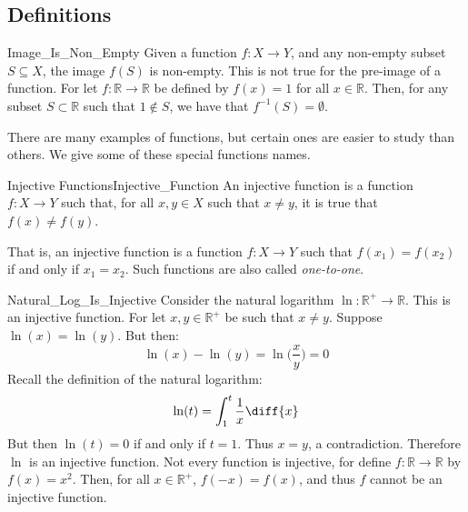     \subsection{Definitions}
        \begin{lexample}{}{Image_Is_Non_Empty}
            Given a function $f:X\rightarrow{Y}$, and any non-empty subset
            $S\subseteq{X}$, the image $f(S)$ is non-empty. This is not
            true for the pre-image of a function. For let
            $f:\mathbb{R}\rightarrow\mathbb{R}$ be defined by $f(x)=1$ for
            all $x\in\mathbb{R}$. Then, for any subset $S\subset\mathbb{R}$
            such that $1\notin{S}$, we have that
            $f^{\minus{1}}(S)=\emptyset$.
        \end{lexample}
        There are many examples of functions, but certain ones are easier
        to study than others. We give some of these special functions names.
        \begin{ldefinition}{Injective Functions}{Injective_Function}
            An \gls{injective function} is a function
            $f:X\rightarrow{Y}$ such that, for all
            $x,y\in{X}$ such that $x\ne{y}$, it is true that
            $f(x)\ne{f}(y)$.
        \end{ldefinition}
        That is, an injective function is a function
        $f:X\rightarrow{Y}$ such that $f(x_{1})=f(x_{2})$
        if and only if $x_{1}=x_{2}$. Such functions are also
        called \textit{one-to-one}.
        \begin{lexample}{}{Natural_Log_Is_Injective}
            Consider the natural logarithm
            $\ln:\mathbb{R}^{+}\rightarrow\mathbb{R}$. This is an injective
            function. For let $x,y\in\mathbb{R}^{+}$ be such that
            $x\ne{y}$. Suppose $\ln(x)=\ln(y)$. But then:
            \begin{equation}
                \ln(x)-\ln(y)=\ln\Big(\frac{x}{y}\Big)=0
            \end{equation}
            Recall the definition of the natural logarithm:
            \begin{equation}
                \ln(t)=\int_{1}^{t}\frac{1}{x}\diff{x}
            \end{equation}
            But then $\ln(t)=0$ if and only if $t=1$. Thus $x=y$, a
            contradiction. Therefore $\ln$ is an injective function. Not
            every function is injective, for define
            $f:\mathbb{R}\rightarrow\mathbb{R}$ by $f(x)=x^{2}$. Then, for
            all $x\in\mathbb{R}^{+}$, $f(\minus{x})=f(x)$, and thus $f$
            cannot be an injective function.
        \end{lexample}
